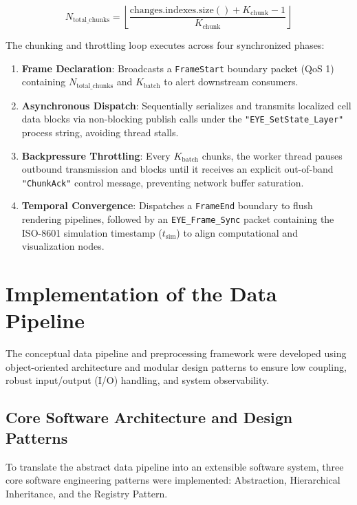 \begin{equation}
    N_{\text{total\_chunks}} = \left\lfloor \frac{\text{changes.indexes.size}() + K_{\text{chunk}} - 1}{K_{\text{chunk}}} \right\rfloor
\end{equation}

The chunking and throttling loop executes across four synchronized phases:

\begin{enumerate}
    \item \textbf{Frame Declaration}: Broadcasts a \texttt{FrameStart} boundary packet (QoS 1) containing $N_{\text{total\_chunks}}$ and $K_{\text{batch}}$ to alert downstream consumers.
    
    \item \textbf{Asynchronous Dispatch}: Sequentially serializes and transmits localized cell data blocks via non-blocking publish calls under the \texttt{"EYE\_SetState\_Layer"} process string, avoiding thread stalls.
    
    \item \textbf{Backpressure Throttling}: Every $K_{\text{batch}}$ chunks, the worker thread pauses outbound transmission and blocks until it receives an explicit out-of-band \texttt{"ChunkAck"} control message, preventing network buffer saturation.
    
    \item \textbf{Temporal Convergence}: Dispatches a \texttt{FrameEnd} boundary to flush rendering pipelines, followed by an \texttt{EYE\_Frame\_Sync} packet containing the ISO-8601 simulation timestamp ($t_{\text{sim}}$) to align computational and visualization nodes.
\end{enumerate}



\section{Implementation of the Data Pipeline}

The conceptual data pipeline and preprocessing framework were developed using object-oriented architecture and modular design patterns to 
ensure low coupling, robust input/output (I/O) handling, and system observability.


\subsection{Core Software Architecture and Design Patterns}

To translate the abstract data pipeline into an extensible software system, three core software engineering patterns were implemented: 
Abstraction, Hierarchical Inheritance, and the Registry Pattern.


